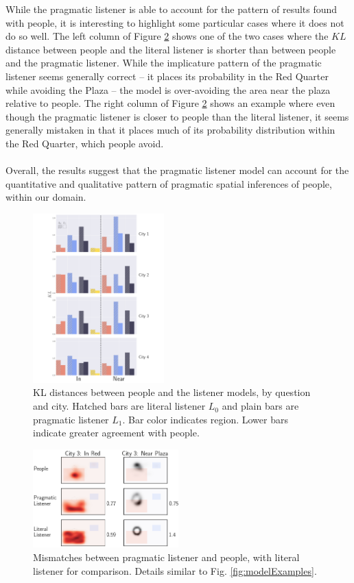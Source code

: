 \documentclass[10pt,letterpaper]{article}
\begin{document}
While the pragmatic listener is able to account for the pattern of results found with people, it is interesting to highlight some particular cases where it does not do so well. The left column of Figure \ref{fig:modelProbs} shows one of the two cases where the $KL$ distance between people and the literal listener is shorter than between people and the pragmatic listener.  While the implicature pattern of the pragmatic listener seems generally correct -- it places its probability in the Red Quarter while avoiding the Plaza -- the model is over-avoiding the area near the plaza relative to people. The right column of Figure \ref{fig:modelProbs} shows an example where even though the pragmatic listener is closer to people than the literal listener, it seems generally mistaken in that it places much of its probability distribution within the Red Quarter, which people avoid. 
\\
\\
Overall, the results suggest that the pragmatic listener model can account for the quantitative and qualitative pattern of pragmatic spatial inferences of people, within our domain. 

\begin{figure}[!t]
\center
\includegraphics[width=0.45\textwidth]{figures/KL.pdf}
\caption{KL distances between people and the listener models, by question and city. Hatched bars are literal listener $L_0$ and plain bars are  pragmatic listener $L_1$. Bar color indicates region. Lower bars indicate greater agreement with people.}
\label{fig:KL}
\end{figure}

 

\begin{figure}[!b]
\center
\includegraphics[width=0.5\textwidth]{figures/Figure5.png}
\caption{Mismatches between pragmatic listener and people, with literal listener for comparison. Details similar to Fig. \ref{fig:modelExamples}.}
\label{fig:modelProbs}
\end{figure}
\end{document}
